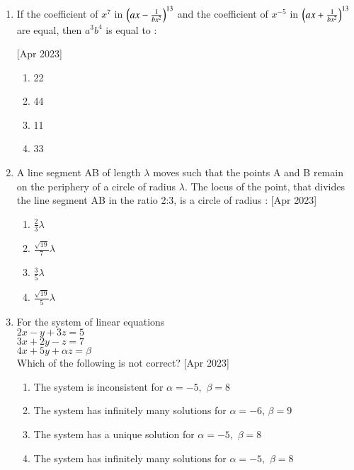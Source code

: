 \documentclass[journal]{IEEEtran}
\begin{document}
\begin{enumerate}
    \item If the coefficient of  $x^7$ in $\left(ax-\frac{1}{bx^2}\right)^{13}$ and the coefficient of $x^{-5}$ in $\left(ax+\frac{1}{bx^2}\right)^{13}$ are equal, then $a^3b^4$ is equal to :
\begin{multicols}{1}
 \hfill{[Apr 2023]}
            \begin{enumerate}
              \item 22
              \item  44
              \item  11
              \item 33
            \end{enumerate}
        \end{multicols}
    \item A line segment AB of length $\lambda$ moves such that the points A and B remain on the periphery of a circle of radius $\lambda$. The locus of the point, that divides the line segment AB in the ratio 2:3, is a circle of radius :
     \hfill{[Apr 2023]}
    \begin{multicols}{1}
            \begin{enumerate}
              \item $\frac{2}{3}\lambda$
              \item   $\frac{\sqrt{19}}{7}\lambda$
              \item   $\frac{3}{5}\lambda$
              \item  $\frac{\sqrt{19}}{5}\lambda$
            \end{enumerate}
        \end{multicols}
    \item For the system of linear equations \\
    $2x-y+3z=5$\\
    $3x+2y-z=7$\\
    $4x+5y+\alpha z=\beta$\\
    Which of the following is not correct?
     \hfill{[Apr 2023]}
    \begin{multicols}{1}
            \begin{enumerate}
              \item The system is inconsistent for $\alpha =-5,$ $\beta = 8$
              \item The system has infinitely many solutions for $\alpha =-6$, $\beta = 9$
              \item The system has a unique solution  for $\alpha =-5,$ $\beta = 8$
              \item The system has infinitely many solutions for $\alpha =-5,$ $\beta = 8$
            \end{enumerate}
        \end{multicols}
     

\end{enumerate}
\end{document}
